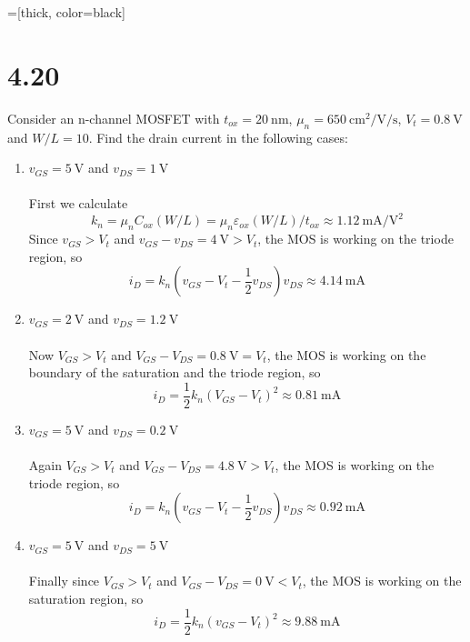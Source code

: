 \documentclass[12pt, a4paper]{article}
\title{} %
\author{} %
\date{} %
\begin{document}
=[thick, color=black]


\section{4.20}
Consider an n-channel MOSFET with $t_{ox} = \SI{20}\nm$, $\mu_{n} = \SI{650}{\cm\squared\per\V\per\s}$, $V_t = \SI{0.8}\V$ and $W/L = 10$. Find the drain current in the following cases:

\begin{enumerate}[label=(\alph*)]
  \item $v_{GS} = \SI{5}{\V}$ and $v_{DS} = \SI{1}{\V} $\\[5pt]
    \Ans \\
    First we calculate 
    \[ k_n = \mu_n C_{ox} (W / L) = \mu_n \varepsilon_{ox} (W / L) /  t_{ox} \approx \SI{1.12}{\mA\per\V\squared} \]
    Since $v_{GS} > V_t$ and $v_{GS} - v_{DS} = \SI{4}{\V} > V_t$, the MOS is working on the triode region, so 
    \[
      i_D =  k_n \left(v_{GS} - V_t - \frac{1}{2}v_{DS} \right)v_{DS} \approx \SI{4.14}{\mA} 
    \]
  \item $v_{GS} = \SI{2}{\V}$ and $v_{DS} = \SI{1.2}{\V} $\\[5pt]
    \Ans \\
    Now $V_{GS} > V_t$ and $V_{GS} - V_{DS} = \SI{0.8}{\V} = V_t$, the MOS is working on the boundary of the saturation and the triode region, so 
    \[
      i_D = \frac{1}{2} k_n (V_{GS} - V_t)^2 \approx \SI{0.81}{\mA} 
    \]
  \item $v_{GS} = \SI{5}{\V}$ and $v_{DS} = \SI{0.2}{\V} $\\[5pt]
    \Ans \\
    Again $V_{GS} > V_t$ and $V_{GS} - V_{DS} = \SI{4.8}{\V} > V_t$, the MOS is working on the triode region, so 
    \[
      i_D =  k_n \left(v_{GS} - V_t - \frac{1}{2}v_{DS} \right)v_{DS} \approx \SI{0.92}{\mA} 
    \]
  \item $v_{GS} = \SI{5}{\V}$ and $v_{DS} = \SI{5}{\V} $\\[5pt]
    \Ans \\
    Finally since $V_{GS} > V_t$ and $V_{GS} - V_{DS} = \SI{0}{\V} < V_t$, the MOS is working on the saturation region, so 
    \[
      i_D =  \frac{1}{2} k_n (v_{GS} - V_t)^2 \approx \SI{9.88}{\mA} 
    \]
\end{enumerate}
\end{document}
